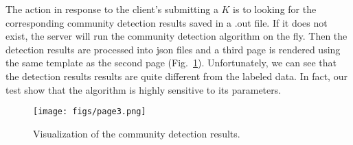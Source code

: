 The action in response to the client's submitting a $K$ is to looking for the
corresponding community detection results saved in a .out file. If it does not
exist, the server will run the community detection algorithm on the fly. Then
the detection results are processed into json files and a third page is rendered
using the same template as the second page (Fig.~\ref{fig:page3}).
Unfortunately, we can see that the detection results results are quite different
from the labeled data. In fact, our test show that the algorithm is highly
sensitive to its parameters.

\begin{figure}[!t]
    \centering
    \texttt{[image: figs/page3.png]}
    \caption{Visualization of the community detection results.}
    \label{fig:page3}
\end{figure}